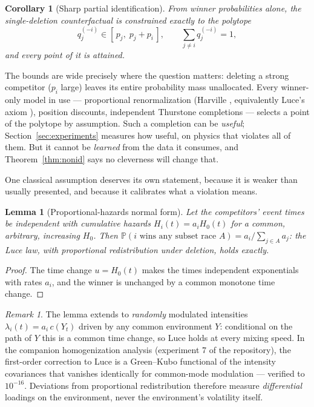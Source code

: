 \documentclass[11pt]{article}
\newtheorem{lemma}{Lemma}
\newtheorem{corollary}{Corollary}
\theoremstyle{remark}
\newtheorem{remark}{Remark}
\newcommand{\Prob}{\mathbb{P}}
\begin{document}
\begin{corollary}[Sharp partial identification]\label{cor:polytope}
From winner probabilities alone, the single-deletion counterfactual is constrained
exactly to the polytope
\[
q_j^{(-i)} \in [\,p_j,\; p_j + p_i\,], \qquad \textstyle\sum_{j \ne i} q_j^{(-i)} = 1,
\]
and every point of it is attained.
\end{corollary}

The bounds are wide precisely where the question matters: deleting a strong
competitor ($p_i$ large) leaves its entire probability mass unallocated. Every
winner-only model in use --- proportional renormalization (Harville
\cite{harville1973}, equivalently Luce's axiom \cite{luce1959}), position discounts,
independent Thurstone completions --- selects a point of the polytope by assumption.
Such a completion can be \emph{useful}; Section~\ref{sec:experiments} measures how
useful, on physics that violates all of them. But it cannot be \emph{learned} from
the data it consumes, and Theorem~\ref{thm:nonid} says no cleverness will change
that.

One classical assumption deserves its own statement, because it is weaker than
usually presented, and because it calibrates what a violation means.

\begin{lemma}[Proportional-hazards normal form]\label{lem:ph}
Let the competitors' event times be independent with cumulative hazards
$H_i(t) = a_i H_0(t)$ for a common, arbitrary, increasing $H_0$. Then
$\Prob(i \text{ wins any subset race } A) = a_i / \sum_{j \in A} a_j$: the Luce law,
with proportional redistribution under deletion, holds exactly.
\end{lemma}

\begin{proof}
The time change $u = H_0(t)$ makes the times independent exponentials with rates
$a_i$, and the winner is unchanged by a common monotone time change.
\end{proof}

\begin{remark}
The lemma extends to \emph{randomly} modulated intensities
$\lambda_i(t) = a_i\,c(Y_t)$ driven by any common environment $Y$: conditional on
the path of $Y$ this is a common time change, so Luce holds at every mixing speed.
In the companion homogenization analysis (experiment 7 of the repository), the
first-order correction to Luce is a Green--Kubo functional of the intensity
covariances that vanishes identically for common-mode modulation --- verified to
$10^{-16}$. Deviations from proportional redistribution therefore measure
\emph{differential} loadings on the environment, never the environment's volatility
itself.
\end{remark}
\end{document}
